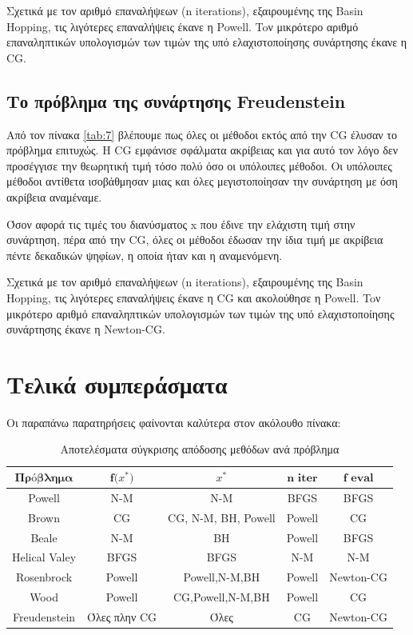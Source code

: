 \documentclass[a4paper,12pt,twoside]{report}
\theoremstyle{plain}
\theoremstyle{definition}
\theoremstyle{remark}
\begin{document}
Σχετικά με τον αριθμό επαναλήψεων (n iterations), εξαιρουμένης της Basin Hopping, τις λιγότερες επαναλήψεις έκανε η Powell.  Toν μικρότερο αριθμό επαναληπτικών υπολογισμών των τιμών της υπό ελαχιστοποίησης συνάρτησης έκανε η CG.

\subsection{Το πρόβλημα της συνάρτησης Freudenstein}

Από τον πίνακα \ref{tab:7} βλέπουμε πως όλες οι μέθοδοι εκτός από την CG έλυσαν το πρόβλημα επιτυχώς. H CG εμφάνισε σφάλματα ακρίβειας και για αυτό τον λόγο δεν προσέγγισε την θεωρητική τιμή τόσο πολύ όσο οι υπόλοιπες μέθοδοι. Οι υπόλοιπες μέθοδοι αντίθετα ισοβάθμησαν μιας και όλες μεγιστοποίησαν την συνάρτηση με όση ακρίβεια αναμέναμε.

Όσον αφορά τις τιμές του διανύσματος x που έδινε την ελάχιστη τιμή στην συνάρτηση, πέρα από την CG, όλες οι μέθοδοι έδωσαν την ίδια τιμή με ακρίβεια πέντε δεκαδικών ψηφίων, η οποία ήταν και η αναμενόμενη. 

Σχετικά με τον αριθμό επαναλήψεων (n iterations), εξαιρουμένης της Basin Hopping, τις λιγότερες επαναλήψεις έκανε η CG και ακολούθησε η Powell. Toν μικρότερο αριθμό επαναληπτικών υπολογισμών των τιμών της υπό ελαχιστοποίησης συνάρτησης έκανε η Newton-CG.

\section{Τελικά συμπεράσματα}

Οι παραπάνω παρατηρήσεις φαίνονται καλύτερα στον ακόλουθο πίνακα:

\begin{table}[h]
\centering
\label{tab:res1}
\begin{tabular}{|c|c|c|c|c|}
\hline
$\textbf{Πρόβλημα}$ & $\textbf{f($x^{*}$)}$ & $\textbf{$x^{*}$}$          & $\textbf{n iter}$ & $\textbf{f eval}$ \\ \hline
Powell                       & N-M           & N-M                 & BFGS            & BFGS            \\ \hline
Brown                        & CG            & CG, N-M, BH, Powell & Powell          & CG              \\ \hline
Beale                        & N-M           & BH                  & Powell          & BFGS            \\ \hline
Helical Valey                & BFGS          & BFGS                & N-M             & N-M             \\ \hline
Rosenbrock                    & Powell        & Powell,N-M,BH       & Powell          & Newton-CG       \\ \hline
Wood                         & Powell        & CG,Powell,N-M,BH    & Powell          & CG              \\ \hline
Freudenstein                 & Όλες πλην CG  & Όλες                & CG              & Newton-CG       \\ \hline
\end{tabular}
\caption{Αποτελέσματα σύγκρισης απόδοσης μεθόδων ανά πρόβλημα}
\end{table}
\end{document}
